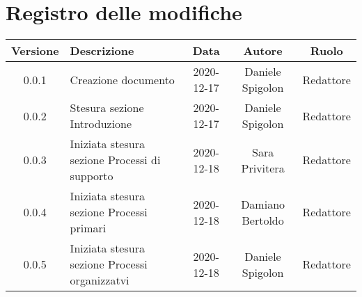 \section*{Registro delle modifiche}

\begin{center}
	\begin{longtable}{|c|p{5cm}|c|c|c|}
	\hline
	\rowcolor{lighter-grayer}
	\textbf{Versione} & \textbf{Descrizione} & \textbf{Data} & \textbf{Autore} & \textbf{Ruolo} \\
	\hline
	\endfirsthead


	0.0.1 & Creazione documento & 2020-12-17 & Daniele Spigolon & Redattore \\
	\hline
	0.0.2 & Stesura sezione Introduzione & 2020-12-17 & Daniele Spigolon & Redattore \\
	\hline
	0.0.3 & Iniziata stesura sezione Processi di supporto & 2020-12-18 & Sara Privitera & Redattore \\
	\hline	
	0.0.4 & Iniziata stesura sezione Processi primari & 2020-12-18 & Damiano Bertoldo & Redattore \\
	\hline
	0.0.5 & Iniziata stesura sezione Processi organizzatvi & 2020-12-18 & Daniele Spigolon & Redattore \\
	\hline
	

	\end{longtable}
\end{center}